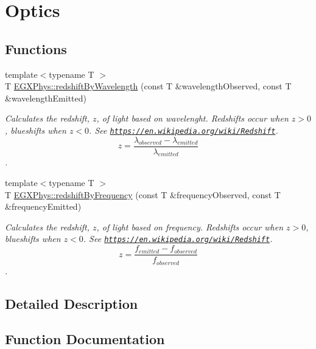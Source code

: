 \hypertarget{group___optics}{}\section{Optics}
\label{group___optics}
\subsection*{Functions}
\begin{DoxyCompactItemize}
\item 
{\footnotesize template$<$typename T $>$ }\\T \mbox{\hyperlink{group___optics_ga29300a13e34da35332ca2d447b5ce82d}{E\+G\+X\+Phys\+::redshift\+By\+Wavelength}} (const T \&wavelength\+Observed, const T \&wavelength\+Emitted)
\begin{DoxyCompactList}\small\item\em Calculates the redshift, $z$, of light based on wavelenght. Redshifts occur when $z > 0$, blueshifts when $z < 0$. See \href{https://en.wikipedia.org/wiki/Redshift}{\tt https\+://en.\+wikipedia.\+org/wiki/\+Redshift}. \[z=\frac{\lambda_{observed}-\lambda_{emitted}}{\lambda_{emitted}}\]. \end{DoxyCompactList}\item 
{\footnotesize template$<$typename T $>$ }\\T \mbox{\hyperlink{group___optics_gacc6d3b2922061214d64b89a4b8e3967a}{E\+G\+X\+Phys\+::redshift\+By\+Frequency}} (const T \&frequency\+Observed, const T \&frequency\+Emitted)
\begin{DoxyCompactList}\small\item\em Calculates the redshift, $z$, of light based on frequency. Redshifts occur when $z > 0$, blueshifts when $z < 0$. See \href{https://en.wikipedia.org/wiki/Redshift}{\tt https\+://en.\+wikipedia.\+org/wiki/\+Redshift}. \[z=\frac{f_{emitted}-f_{observed}}{f_{observed}}\]. \end{DoxyCompactList}\end{DoxyCompactItemize}


\subsection{Detailed Description}


\subsection{Function Documentation}
\mbox{\label{group___optics_gacc6d3b2922061214d64b89a4b8e3967a}} 
